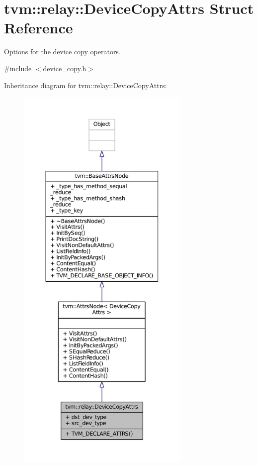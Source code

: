 \hypertarget{structtvm_1_1relay_1_1DeviceCopyAttrs}{}\section{tvm\+:\+:relay\+:\+:Device\+Copy\+Attrs Struct Reference}
\label{structtvm_1_1relay_1_1DeviceCopyAttrs}


Options for the device copy operators.  




{\ttfamily \#include $<$device\+\_\+copy.\+h$>$}



Inheritance diagram for tvm\+:\+:relay\+:\+:Device\+Copy\+Attrs\+:
\nopagebreak
\begin{figure}[H]
\begin{center}
\leavevmode
\includegraphics[height=550pt]{structtvm_1_1relay_1_1DeviceCopyAttrs__inherit__graph}
\end{center}
\end{figure}


